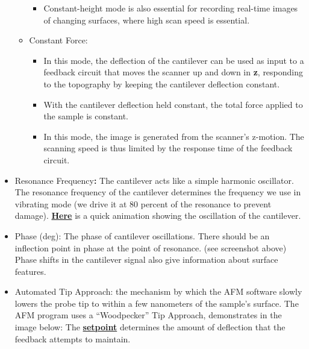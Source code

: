 \documentclass{../lab}
\begin{document}
\begin{itemize}
\begin{itemize}
\begin{itemize}
            \item Constant-height mode is also essential for recording real-time images of changing surfaces, where high scan speed is essential.

        \end{itemize}

        \item Constant Force:

        \begin{itemize}
            \item In this mode, the deflection of the cantilever can be used as input to a feedback circuit that moves the scanner up and down in \textbf{z}, responding to the topography by keeping the cantilever deflection constant.

            \item With the cantilever deflection held constant, the total force applied to the sample is constant.

            \item In this mode, the image is generated from the scanner’s z-motion. The scanning speed is thus limited by the response time of the feedback circuit.

        \end{itemize}

    \end{itemize}

    \item Resonance Frequency\textbf{:}  The cantilever acts like a simple harmonic oscillator. The resonance frequency of the cantilever determines the frequency we use in vibrating mode (we drive it at 80 percent of the resonance to prevent damage). \href{http://experimentationlab.berkeley.edu/sites/default/files/AFMImages/2.1.1.\%20Intro\%20Vibrating\%20Cantf.swf.mp4}{\textbf{Here}} is a quick animation showing the oscillation of the cantilever.

    \item Phase (deg): The phase of cantilever oscillations.  There should be an inflection point in phase at the point of resonance. (see screenshot above) Phase shifts in the cantilever signal also give information about surface features.

    \item ​Automated Tip Approach:  the mechanism by which the AFM software slowly lowers the probe tip to within a few nanometers of the sample's surface.  The AFM program uses a ``Woodpecker'' Tip Approach, demonstrates in the image below:  The \href{http://experimentationlab.berkeley.edu/sites/default/files/AFMImages/VM\%203.3.\%20Avg\%20Dist\%20Control\_converted.mp4}{\textbf{setpoint}} determines the amount of deflection that the feedback attempts to maintain.

\end{itemize}
\end{document}

